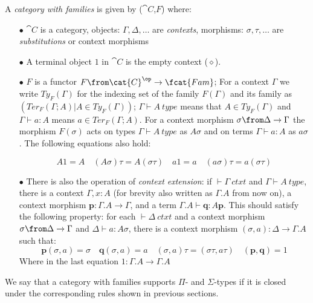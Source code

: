 \begin{definition}
A \emph{category with families} is given by ($\cat{C}$,$F$) where:

\begin{itemize}
  \item[$\bullet$] $\cat{C}$ is a category, objects: $\Gamma, \Delta, \dots$ are
    \emph{contexts}, morphisms:  $\sigma, \tau, \dots$ are
    \emph{substitutions} or context morphisms

  \item[$\bullet$] A terminal object $1$ in $\cat{C}$ is the empty context ($\diamond$).

  \item[$\bullet$] $F$ is a functor $F\from \cat{C}^\op \to \fcat{Fam}$; For a
    context $\Gamma$ we write $Ty_F(\Gamma)$ for the indexing set of the family
    $F(\Gamma)$ and its family as $(Ter_F(\Gamma;A) | A \in Ty_F(\Gamma))$;
    $\Gamma \vdash A~type$ means that $A \in Ty_F(\Gamma)$ and $\Gamma \vdash a
    : A$ means $a \in Ter_F(\Gamma;A)$. For a context morphism $\sigma \from
    \Delta \to \Gamma$ the morphism $F(\sigma)$ acts on types $\Gamma \vdash
    A~type$ as $A\sigma$ and on terms $\Gamma \vdash a : A$ as $a\sigma$. The
    following equations also hold:

    \[
      A1=A \quad (A\sigma)\tau = A(\sigma\tau) \quad a1=a \quad (a\sigma)\tau=a(\sigma\tau)
    \]

  \item[$\bullet$] There is also the operation of \emph{context extension}: if
    $\vdash \Gamma~ctxt$ and $\Gamma \vdash A~type$, there is a context
    $\Gamma, x:A$ (for brevity also written as $\Gamma.A$ from now on), a
    context morphism $\mathbf{p}: \Gamma.A \to \Gamma$, and a term $\Gamma.A
    \vdash \mathbf{q} : A \mathbf{p}$. This should satisfy the following
    property: for each $\vdash \Delta~ctxt$ and a context morphism
    $\sigma \from \Delta \to \Gamma$ and $\Delta \vdash a : A \sigma$, there is
    a context morphism $(\sigma, a): \Delta \to \Gamma.A$ such that:
    \[
      \mathbf{p}(\sigma, a) = \sigma \quad \mathbf{q}(\sigma, a) = a \quad (\sigma, a) \tau =
      (\sigma \tau, a \tau) \quad (\mathbf{p}, \mathbf{q}) = 1
    \]
    Where in the last equation $1: \Gamma.A \to \Gamma.A$
\end{itemize}
\end{definition}

We say that a category with families supports $\Pi$- and $\Sigma$-types if it is
closed under the corresponding rules shown in previous sections.

